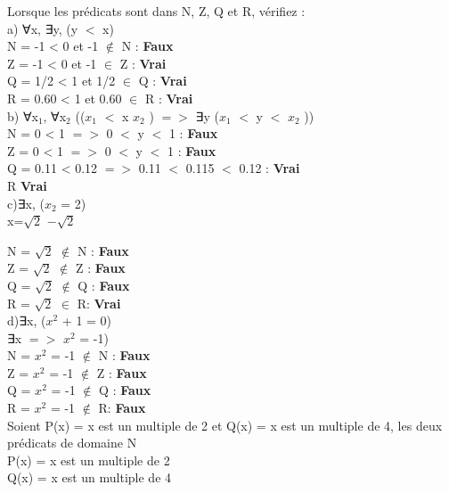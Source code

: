 Lorsque les prédicats sont dans N, Z, Q et R, vérifiez : \\

a) ∀x, ∃y, (y $<$ x) \\

N = -1 < 0 et -1 $\notin$ N : \textbf{Faux} \\
Z = -1 < 0 et -1 $\in$ Z : \textbf{Vrai} \\
Q = 1/2 < 1 et 1/2 $\in$ Q : \textbf{Vrai} \\
R = 0.60 < 1 et 0.60 $\in$ R : \textbf{Vrai} \\

b) ∀x$_{1}$, ∀x$_{2}$ (($x_{1}$ $<$ x $x_{2}$ ) $=>$ ∃y ($x_{1}$ $<$ y $<$ $x_{2}$ )) \\

N = 0 < 1 $=>$ 0 $<$ y $<$ 1 : \textbf{Faux} \\
Z = 0 < 1 $=>$ 0 $<$ y $<$ 1 : \textbf{Faux} \\
Q = 0.11 < 0.12 $=>$ 0.11 $<$ 0.115 $<$ 0.12 : \textbf{Vrai} \\
R \textbf{Vrai} \\

c)∃x, ($x_{2}$ = 2) \\

x=$\sqrt{2}$ $-\sqrt{2}$

N = $\sqrt{2}$ $\notin$ N : \textbf{Faux} \\
Z = $\sqrt{2}$ $\notin$ Z : \textbf{Faux} \\
Q = $\sqrt{2}$ $\notin$ Q : \textbf{Faux} \\
R = $\sqrt{2}$ $\in$ R: \textbf{Vrai} \\

d)∃x, ($x^{2}$ + 1 = 0) \\

∃x $=>$ $x^{2}$ = -1) \\

N = $x^{2}$ = -1 $\notin$ N : \textbf{Faux} \\
Z = $x^{2}$ = -1 $\notin$ Z : \textbf{Faux} \\
Q = $x^{2}$ = -1 $\notin$ Q : \textbf{Faux} \\
R = $x^{2}$ = -1 $\notin$ R: \textbf{Faux} \\

Soient P(x) = x est un multiple de 2 et Q(x) = x est un multiple de 4, les deux prédicats de domaine N \\

P(x) = x est un multiple de 2 \\
Q(x) = x est un multiple de 4 \\

